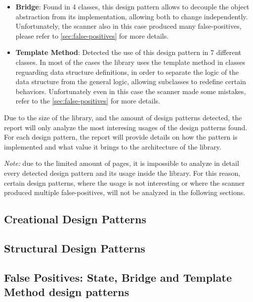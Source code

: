 \begin{itemize}
	\item \textbf{Bridge}: Found in 4 classes, this design pattern allows to decouple the object abstraction from its implementation, allowing both to change independently. Unfortunately, the scanner also in this case produced many false-positives, please refer to \autoref{sec:false-positives} for more details.

	\item \textbf{Template Method}: Detected the use of this design pattern in 7 different classes. In most of the cases the library uses the template method in classes reguarding data structure definitions, in order to separate the logic of the data structure from the general logic, allowing subclasses to redefine certain behaviors. Unfortunately even in this case the scanner made some mistakes, refer to the \autoref{sec:false-positives} for more details.

\end{itemize}

\noindent Due to the size of the library, and the amount of design patterns detected, the report will only analyze the most interesing usages of the design patterns found. For each design pattern, the report will provide details on how the pattern is implemented and what value it brings to the architecture of the library.

\textit{Note:} due to the limited amount of pages, it is impossible to analyze in detail every detected design pattern and its usage inside the library. For this reason, certain design patterns, where the usage is not interesting or where the scanner produced multiple false-positives, will not be analyzed in the following sections.

\subsection{Creational Design Patterns}



\subsection{Structural Design Patterns}



\subsection{False Positives: State, Bridge and Template Method design patterns}
\label{sec:false-positives}

